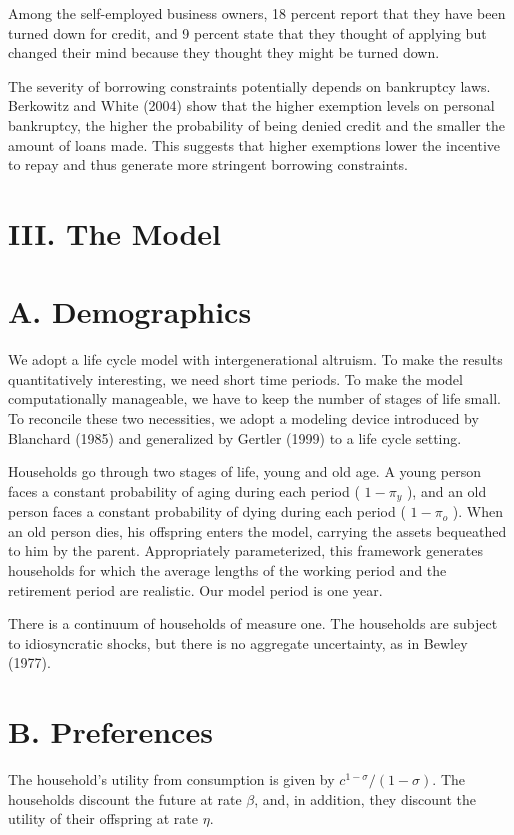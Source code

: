 \documentclass[10pt]{article}
\begin{document}
Among the self-employed business owners, 18 percent report that they have been turned down for credit, and 9 percent state that they thought of applying but changed their mind because they thought they might be turned down.

The severity of borrowing constraints potentially depends on bankruptcy laws. Berkowitz and White (2004) show that the higher exemption levels on personal bankruptcy, the higher the probability of being denied credit and the smaller the amount of loans made. This suggests that higher exemptions lower the incentive to repay and thus generate more stringent borrowing constraints.

\section*{III. The Model}
\section*{A. Demographics}
We adopt a life cycle model with intergenerational altruism. To make the results quantitatively interesting, we need short time periods. To make the model computationally manageable, we have to keep the number of stages of life small. To reconcile these two necessities, we adopt a modeling device introduced by Blanchard (1985) and generalized by Gertler (1999) to a life cycle setting.

Households go through two stages of life, young and old age. A young person faces a constant probability of aging during each period ( $1- \pi_{y}$ ), and an old person faces a constant probability of dying during each period ( $1-\pi_{o}$ ). When an old person dies, his offspring enters the model, carrying the assets bequeathed to him by the parent. Appropriately parameterized, this framework generates households for which the average lengths of the working period and the retirement period are realistic. Our model period is one year.

There is a continuum of households of measure one. The households are subject to idiosyncratic shocks, but there is no aggregate uncertainty, as in Bewley (1977).

\section*{B. Preferences}
The household's utility from consumption is given by $c^{1-\sigma} /(1-\sigma)$. The households discount the future at rate $\beta$, and, in addition, they discount the utility of their offspring at rate $\eta$.
\end{document}
